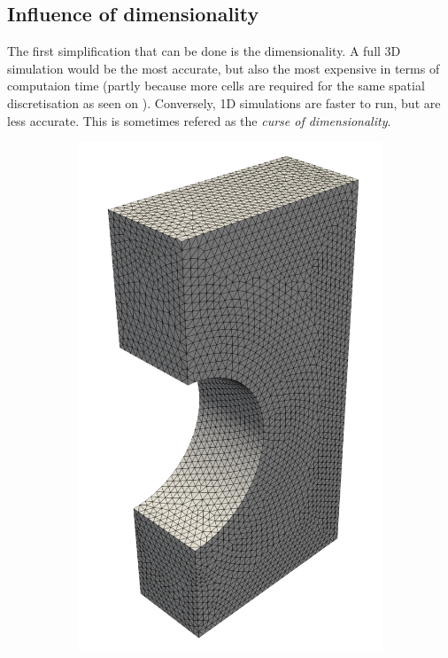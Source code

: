 \subsection{Influence of dimensionality}

The first simplification that can be done is the dimensionality.
A full 3D simulation would be the most accurate, but also the most expensive in terms of computaion time (partly because more cells are required for the same spatial discretisation as seen on ).
Conversely, 1D simulations are faster to run, but are less accurate.
This is sometimes refered as the \textit{curse of dimensionality}.

\begin{figure}
    \centering
    \begin{subfigure}{0.27\linewidth}
        \includegraphics[width=\linewidth]{Figures/Chapter3/monoblocks/mesh_3d.png}

\end{subfigure}
\end{figure}
